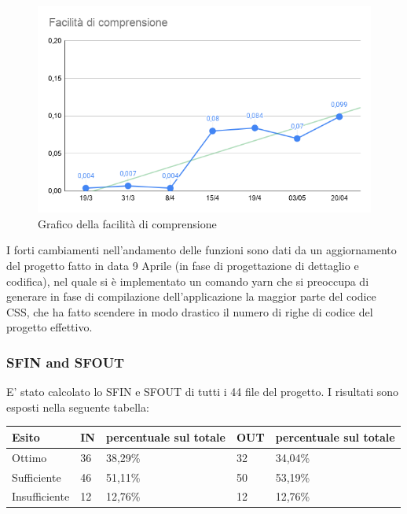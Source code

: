     \begin{figure}[H]
        \centering
        \includegraphics[width=10 cm]{source/sections/images/Facilita_comprensione.png}
        \caption{Grafico della facilità di comprensione}
    \end{figure}

    I forti cambiamenti nell'andamento delle funzioni sono dati da un aggiornamento del progetto fatto in data
    9 Aprile (in fase di progettazione di dettaglio e codifica), nel quale si è implementato un comando yarn che si preoccupa di generare in fase di compilazione dell'applicazione la maggior parte del
    codice CSS, che ha fatto scendere in modo drastico il numero di righe di codice del progetto effettivo.
\newpage
\subsubsection{SFIN and SFOUT}
    E' stato calcolato lo SFIN e SFOUT di tutti i 44 file del progetto. I risultati sono esposti nella seguente tabella:

    \begin{longtabu} to \textwidth {| X[0.1,c m] | X[0.1,c m] | X[0.1,c m] | X[0.1,c m] | X[0.1,c m] |}
        \hline
        \textbf{Esito} &
        \textbf{IN} &
        \textbf{percentuale sul totale} &
        \textbf{OUT} &
        \textbf{percentuale sul totale} \\
        \hline
        Ottimo & 36 & 38,29\% & 32 & 34,04\% \\ 
        \hline
        Sufficiente & 46 & 51,11\% & 50 & 53,19\% \\ 
        \hline
        Insufficiente & 12 & 12,76\% & 12 & 12,76\% \\ 
        \hline

        \end{longtabu}

